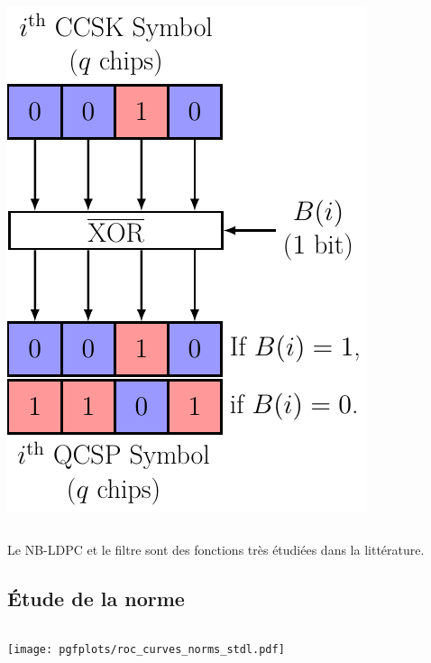 \documentclass[../main.tex]{subfiles}
\begin{document}
\begin{frame}{\subsecname}
\begin{columns}
\begin{column}{.35\linewidth}
\begin{overlayarea}{\linewidth}{.5\textheight}
        \includegraphics[width=\linewidth, height=.55\textheight, keepaspectratio = true]{figures/tikzpicture/ovmod_simd_stdl.pdf}
      \end{overlayarea}
    \end{column}
  \end{columns}

  \vspace{4 em}

  \begin{center}
    Le NB-LDPC et le filtre sont des fonctions très étudiées dans la littérature.
  \end{center}
\end{frame}


\subsection*{Étude de la norme}
\begin{frame}{\subsecname}
  \begin{columns}
    \begin{column}{.9 \linewidth}
      \centering
      \texttt{[image: pgfplots/roc\_curves\_norms\_stdl.pdf]}
    \end{column}
  \end{columns}
\end{frame}
\end{document}
